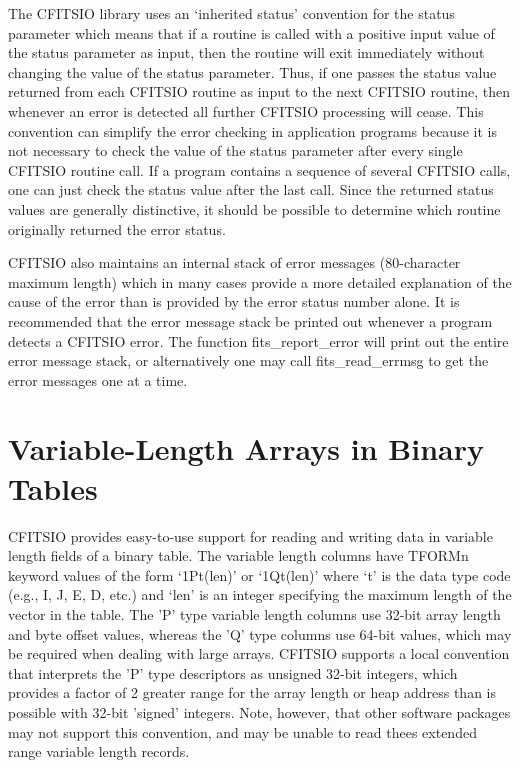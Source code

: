\documentclass[11pt]{book}
\begin{document}
The CFITSIO library uses an `inherited status' convention for the
status parameter which means that if a routine is called with a
positive input value of the status parameter as input, then the routine
will exit immediately without changing the value of the status
parameter.  Thus, if one passes the status value returned from each
CFITSIO routine as input to the next CFITSIO routine, then whenever an
error is detected all further CFITSIO processing will cease.  This
convention can simplify the error checking in application programs
because it is not necessary to check the value of the status parameter
after every single CFITSIO routine call.  If a program contains a
sequence of several CFITSIO calls, one can just check the status value
after the last call.  Since the returned status values are generally
distinctive, it should be possible to determine which routine
originally returned the error status.

CFITSIO also maintains an internal stack of error messages
(80-character maximum length)  which in many cases provide a more
detailed explanation of the cause of the error than is provided by the
error status number alone.  It is recommended that the error message
stack be printed out whenever a program detects a CFITSIO error.  The
function fits\_report\_error will print out the entire error message
stack, or alternatively one may call fits\_read\_errmsg to get the
error messages one at a time.


\section{Variable-Length Arrays in Binary Tables}

CFITSIO provides easy-to-use support for reading and writing data in
variable length fields of a binary table. The variable length columns
have TFORMn keyword values of the form `1Pt(len)' or `1Qt(len)' where `t'
is the data type code (e.g., I, J, E, D, etc.) and `len' is an integer
specifying the maximum length of the vector in the table.  The 'P' type
variable length columns use 32-bit array length and byte offset values, whereas
the 'Q' type columns use 64-bit values, which may be required when dealing
with large arrays.  CFITSIO supports a local convention that interprets
the 'P' type descriptors as unsigned 32-bit integers, which provides
a factor of 2 greater range for the array length or heap address than
is possible with 32-bit 'signed' integers.  Note, however, that other software
packages may not support this convention, and may be unable to read thees
extended range variable length records.
\end{document}
